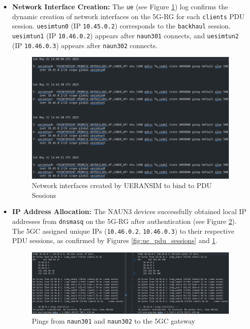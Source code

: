 \begin{itemize}
    \item \textbf{Network Interface Creation:} The \texttt{ue} (see Figure \ref{fig:ue_pdu_sessions_nics}) log confirms the dynamic creation of network interfaces on the \ac{5G-RG} for each \texttt{clients} \ac{PDU} session. \texttt{uesimtun0} (\ac{IP} \texttt{10.45.0.2}) corresponds to the \texttt{backhaul} session. \texttt{uesimtun1} (\ac{IP} \texttt{10.46.0.2}) appears after \texttt{naun301} connects, and \texttt{uesimtun2} (\ac{IP} \texttt{10.46.0.3}) appears after \texttt{naun302} connects.

    \begin{figure}
        \centering
        \includegraphics[width=1\linewidth]{figs/ue_pdu_sessions_nics.png}
        \caption{Network interfaces created by UERANSIM to bind to \ac{PDU} Sessions}
        \label{fig:ue_pdu_sessions_nics}
    \end{figure}

    \item \textbf{\ac{IP} Address Allocation:} The \ac{NAUN3} devices successfully obtained local \ac{IP} addresses from \texttt{dnsmasq} on the \ac{5G-RG} after authentication (see Figure \ref{fig:ping_gw}). The \ac{5GC} assigned unique \acp{IP} (\texttt{10.46.0.2}, \texttt{10.46.0.3}) to their respective \ac{PDU} sessions, as confirmed by Figures \ref{fig:ue_pdu_sessions} and \ref{fig:ue_pdu_sessions_nics}.

    \begin{figure}
        \centering
        \includegraphics[width=1\linewidth]{figs/ping_gw.png}
        \caption{Pings from \texttt{naun301} and \texttt{naun302} to the \ac{5GC} gateway}
        \label{fig:ping_gw}
    \end{figure}
\end{itemize}

